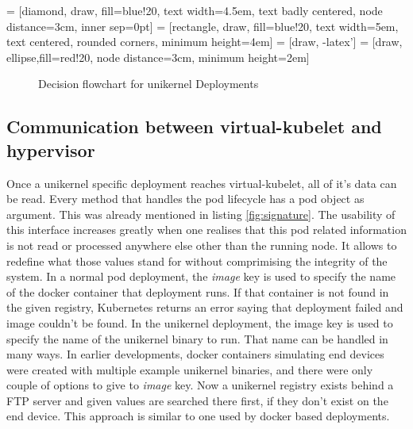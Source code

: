  = [diamond, draw, fill=blue!20, 
    text width=4.5em, text badly centered, node distance=3cm, inner sep=0pt]
 = [rectangle, draw, fill=blue!20, 
    text width=5em, text centered, rounded corners, minimum height=4em]
 = [draw, -latex']
 = [draw, ellipse,fill=red!20, node distance=3cm,
    minimum height=2em]
  \begin{figure}[!h]
    \centering
{}
\caption{Decision flowchart for unikernel Deployments}
\label{fig:deployment-flowchart}
\end{figure}
\subsection{Communication between virtual-kubelet and hypervisor}
Once a unikernel specific deployment reaches virtual-kubelet, all of it's data can be read. Every method that handles the pod lifecycle has a pod object as argument. This was already mentioned in listing \ref{fig:signature}. The usability of this interface increases greatly when one realises that this pod related information is not read or processed anywhere else other than the running node. It allows to redefine what those values stand for without comprimising the integrity of the system. In a normal pod deployment, the \textit{image} key is used to specify the name of the docker container that deployment runs. If that container is not found in the given registry, Kubernetes returns an error saying that deployment failed and image couldn't be found. In the unikernel deployment, the image key is used to specify the name of the unikernel binary to run. That name can be handled in many ways. In earlier developments, docker containers simulating end devices were created with multiple example unikernel binaries, and there were only couple of options to give to \textit{image} key. Now a unikernel registry exists behind a FTP server and given values are searched there first, if they don't exist on the end device. This approach is similar to one used by docker based deployments.

